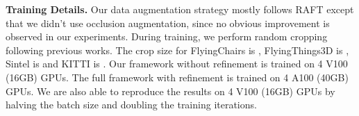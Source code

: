 \documentclass[10pt,twocolumn,letterpaper]{article}
\begin{document}
{\bf Training Details.} Our data augmentation strategy mostly follows RAFT \cite{teed2020raft} except that we didn't use occlusion augmentation, since no obvious improvement is observed in our experiments. During training, we perform random cropping following previous works. The crop size for FlyingChairs is , FlyingThings3D is , Sintel is  and KITTI is . Our framework without refinement is trained on 4 V100 (16GB) GPUs. The full framework with refinement is trained on 4 A100 (40GB) GPUs. We are also able to reproduce the results on 4 V100 (16GB) GPUs by halving the batch size and doubling the training iterations.
\end{document}
